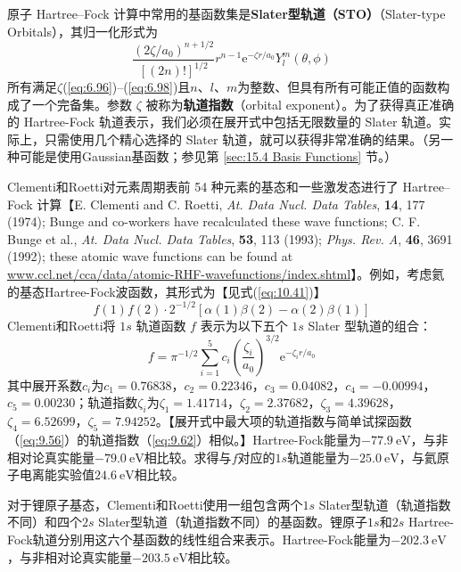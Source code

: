     原子 Hartree–Fock 计算中常用的基函数集是\textbf{Slater型轨道（STO）}（Slater-type Orbitals），其归一化形式为
    \begin{equation}
        \frac{\left(2\zeta/a_0\right)^{n+1/2}}{\left[\left(2n\right)!\right]^{1/2}}r^{n-1}\mathrm{e}^{-\zeta r/a_0}Y_l^m\left(\theta, \phi\right)
        \label{eq:11.14}
    \end{equation}
    所有满足$\zeta$(\ref{eq:6.96})–(\ref{eq:6.98})且$n$、$l$、$m$为整数、但具有所有可能正值的函数构成了一个完备集。参数 $\zeta$ 被称为\textbf{轨道指数}（orbital exponent）。为了获得真正准确的 Hartree-Fock 轨道表示，我们必须在展开式中包括无限数量的 Slater 轨道。实际上，只需使用几个精心选择的 Slater 轨道，就可以获得非常准确的结果。（另一种可能是使用Gaussian基函数；参见第 \ref{sec:15.4 Basis Functions} 节。）

    Clementi和Roetti对元素周期表前 54 种元素的基态和一些激发态进行了 Hartree–Fock 计算【E. Clementi and C. Roetti, \textit{At. Data Nucl. Data Tables}, \textbf{14}, 177 (1974); Bunge and co-workers have recalculated these wave functions; C. F. Bunge et al., \textit{At. Data Nucl. Data Tables}, \textbf{53}, 113 (1993); \textit{Phys. Rev. A}, \textbf{46}, 3691 (1992); these atomic wave functions can be found at \url{www.ccl.net/cca/data/atomic-RHF-wavefunctions/index.shtml}】。例如，考虑氦的基态Hartree-Fock波函数，其形式为【见式(\ref{eq:10.41})】
    \begin{equation*}
        f(1) f(2) \cdot 2^{-1/2} \left[ \alpha(1) \beta(2) - \alpha(2) \beta(1) \right]
    \end{equation*}
    Clementi和Roetti将 $1s$ 轨道函数 $f$ 表示为以下五个 $1s$ Slater 型轨道的组合：
    \begin{equation*}
        f = \pi^{-1/2} \sum_{i=1}^{5} c_i \left( \frac{\zeta_i}{a_0} \right)^{3/2} \mathrm{e}^{-\zeta_i r / a_0}
    \end{equation*}
    其中展开系数$c_i$为$c_1 = 0.76838$，$c_2 = 0.22346$，$c_3 = 0.04082$，$c_4 = -0.00994$，$c_5 = 0.00230$；轨道指数$\zeta_i$为$\zeta_1 = 1.41714$，$\zeta_2 = 2.37682$，$\zeta_3 = 4.39628$，$\zeta_4 = 6.52699$，$\zeta_5 = 7.94252$。【展开式中最大项的轨道指数与简单试探函数（\ref{eq:9.56}）的轨道指数（\ref{eq:9.62}）相似。】Hartree-Fock能量为$-77.9 \: \mathrm{eV}$，与非相对论真实能量$-79.0 \:\mathrm{eV}$相比较。求得与$f$对应的$1s$轨道能量为$-25.0 \:\mathrm{eV}$，与氦原子电离能实验值$24.6 \:\mathrm{eV}$相比较。

    对于锂原子基态，Clementi和Roetti使用一组包含两个$1s$ Slater型轨道（轨道指数不同）和四个$2s$ Slater型轨道（轨道指数不同）的基函数。锂原子$1s$和$2s$ Hartree-Fock轨道分别用这六个基函数的线性组合来表示。Hartree-Fock能量为$-202.3 \:\mathrm{eV}$，与非相对论真实能量$-203.5 \:\mathrm{eV}$相比较。

